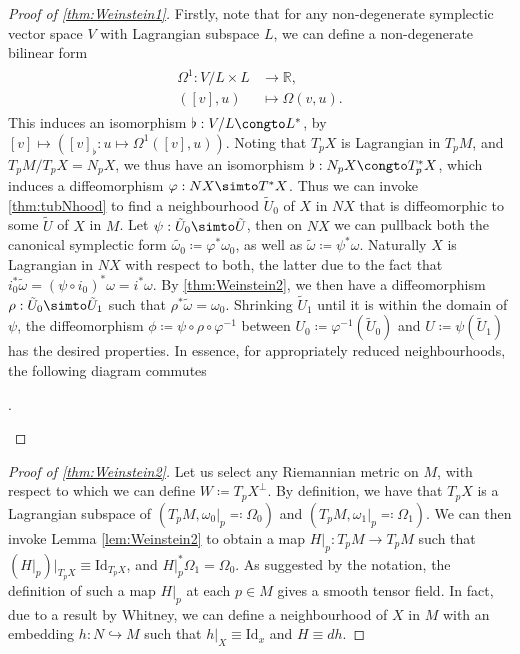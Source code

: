 \documentclass[11pt, final]{article}
\begin{document}
\begin{proof}[Proof of \autoref{thm:Weinstein1}]
	Firstly, note that for any non-degenerate symplectic vector space $V$ with Lagrangian subspace $L$, we can define a non-degenerate bilinear form
		\begin{align} \begin{split}
			\Omega^1 : V/L \times L &\to \mathbb{R}, \\
				\left([v],u\right) &\mapsto \Omega(v,u).
		\end{split} \end{align}
	This induces an isomorphism $\flat: V / L \congto L^*$, by $ [v] \mapsto \left( [v]_\flat: u \mapsto \Omega^1\left([v],u\right) \right)$. Noting that $T_pX$ is Lagrangian in $T_pM$, and $T_pM / T_pX = N_pX$, we thus have an isomorphism $\flat: N_pX \congto T^*_pX$, which induces a diffeomorphism $\varphi: NX \simto T^*X$. Thus we can invoke \autoref{thm:tubNhood} to find a neighbourhood $\tilde{U}_0$ of $X$ in $NX$ that is diffeomorphic to some $\tilde{U}$ of $X$ in $M$. Let $\psi: \tilde{U}_0 \simto \tilde{U}$, then on $NX$ we can pullback both the canonical symplectic form $\tilde{\omega_0} \coloneqq \varphi^* \omega_0$, as well as $\tilde{\omega} \coloneqq \psi^* \omega$. Naturally $X$ is Lagrangian in $NX$ with respect to both, the latter due to the fact that $i_0^* \tilde{\omega} = (\psi \circ i_0)^* \omega = i^* \omega$. By \autoref{thm:Weinstein2}, we then have a diffeomorphism $\rho: \tilde{U}_0 \simto \tilde{U}_1$ such that $\rho^* \tilde{\omega} = \omega_0$. Shrinking $\tilde{U}_1$ until it is within the domain of $\psi$, the diffeomorphism $\phi \coloneqq \psi \circ \rho \circ \varphi^{-1}$ between $U_0 \coloneqq \varphi^{-1}(\tilde{U}_0)$ and $U \coloneqq \psi(\tilde{U}_1)$ has the desired properties. In essence, for appropriately reduced neighbourhoods, the following diagram commutes
		\begin{center}
			.
		\end{center}
\end{proof}

\begin{proof}[Proof of \autoref{thm:Weinstein2}]
	Let us select any Riemannian metric on $M$, with respect to which we can define $W \coloneqq T_pX^\perp$. By definition, we have that $T_pX$ is a Lagrangian subspace of $(T_pM, \omega_0|_p \eqqcolon \Omega_0)$ and $(T_pM, \omega_1|_p \eqqcolon \Omega_1)$. We can then invoke Lemma \autoref{lem:Weinstein2} to obtain a map $H|_p: T_pM \to T_pM$ such that $\left( H|_p \right) |_{T_pX} \equiv \mathrm{Id}_{T_pX}$, and $H|_p^* \Omega_1 = \Omega_0$. As suggested by the notation, the definition of such a map $H|_p$ at each $p \in M$ gives a smooth tensor field. In fact, due to a result by Whitney, we can define a neighbourhood of $X$ in $M$ with an embedding $h: N \hookrightarrow M$ such that $h|_X \equiv \mathrm{Id}_x$ and $H \equiv dh$.
\end{proof} 
\end{document}
